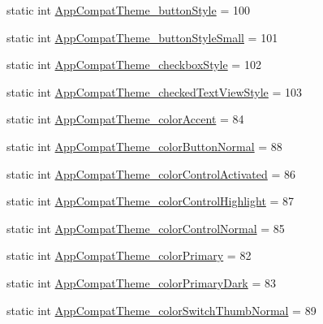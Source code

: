 \begin{DoxyCompactItemize}
\item 
static int \hyperlink{classandroid_1_1support_1_1v7_1_1cardview_1_1R_1_1styleable_a604ddffad2b433e9cf1cfb3aa9f82a43}{App\+Compat\+Theme\+\_\+button\+Style} = 100
\item 
static int \hyperlink{classandroid_1_1support_1_1v7_1_1cardview_1_1R_1_1styleable_a575b1d9c7fa1adee560df29f9326b54b}{App\+Compat\+Theme\+\_\+button\+Style\+Small} = 101
\item 
static int \hyperlink{classandroid_1_1support_1_1v7_1_1cardview_1_1R_1_1styleable_a1297109594ea429301e0fdfe894a1d4a}{App\+Compat\+Theme\+\_\+checkbox\+Style} = 102
\item 
static int \hyperlink{classandroid_1_1support_1_1v7_1_1cardview_1_1R_1_1styleable_aaefec504d42232e1b60c6846dbcb882f}{App\+Compat\+Theme\+\_\+checked\+Text\+View\+Style} = 103
\item 
static int \hyperlink{classandroid_1_1support_1_1v7_1_1cardview_1_1R_1_1styleable_a8b1986b83a7cb120ab848ae271cb90c8}{App\+Compat\+Theme\+\_\+color\+Accent} = 84
\item 
static int \hyperlink{classandroid_1_1support_1_1v7_1_1cardview_1_1R_1_1styleable_ac1be9238d1481c26c4f89271a750fce2}{App\+Compat\+Theme\+\_\+color\+Button\+Normal} = 88
\item 
static int \hyperlink{classandroid_1_1support_1_1v7_1_1cardview_1_1R_1_1styleable_acb93386ddcf1e452debdf2acf6cb2f17}{App\+Compat\+Theme\+\_\+color\+Control\+Activated} = 86
\item 
static int \hyperlink{classandroid_1_1support_1_1v7_1_1cardview_1_1R_1_1styleable_a49a7aa79b96c0ee6b0ea6d734fb2c0c2}{App\+Compat\+Theme\+\_\+color\+Control\+Highlight} = 87
\item 
static int \hyperlink{classandroid_1_1support_1_1v7_1_1cardview_1_1R_1_1styleable_a4c2e0c570b5982613b8cebb46cb6626a}{App\+Compat\+Theme\+\_\+color\+Control\+Normal} = 85
\item 
static int \hyperlink{classandroid_1_1support_1_1v7_1_1cardview_1_1R_1_1styleable_a1ded3a190d020f33c8807adef684cbee}{App\+Compat\+Theme\+\_\+color\+Primary} = 82
\item 
static int \hyperlink{classandroid_1_1support_1_1v7_1_1cardview_1_1R_1_1styleable_a43a0f2dbaa8e5b83115079105d180ee5}{App\+Compat\+Theme\+\_\+color\+Primary\+Dark} = 83
\item 
static int \hyperlink{classandroid_1_1support_1_1v7_1_1cardview_1_1R_1_1styleable_a992cb4f1559d830c77adbb17b8d9d0b6}{App\+Compat\+Theme\+\_\+color\+Switch\+Thumb\+Normal} = 89
\item 

\end{DoxyCompactItemize}
